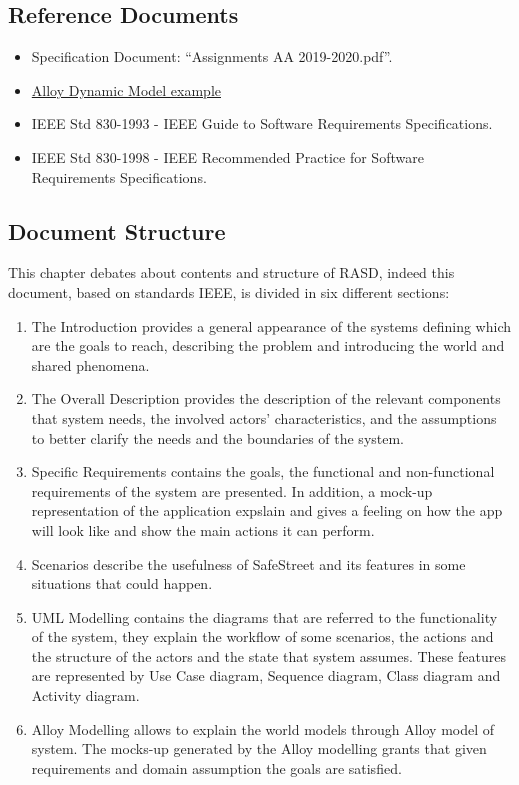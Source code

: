 \subsection {Reference Documents}
\begin{itemize}
\item	Specification Document: “Assignments AA 2019-2020.pdf”.
\item	\href{http://homepage.cs.uiowa.edu/~tinelli/classes/181/Spring10/Notes/09-dynamic-models.pdf }{Alloy Dynamic Model example} 
\item	IEEE Std 830-1993 - IEEE Guide to Software Requirements Specifications.
\item	IEEE Std 830-1998 - IEEE Recommended Practice for Software Requirements Specifications.

\end{itemize}
\subsection{Document Structure}
This chapter debates about contents and structure of RASD, indeed this document, based on standards IEEE, is divided in six different sections:
\begin{enumerate}
\item	The Introduction provides a general appearance of the systems defining which are the goals to reach, describing the problem and introducing the world and shared phenomena.
\item The Overall Description provides the description of the relevant components that system needs, the involved actors’ characteristics, and the assumptions to better clarify the needs and the boundaries of the system. 
\item Specific Requirements contains the goals, the functional and non-functional requirements of the system are presented. In addition, a mock-up representation of the application expslain and gives a feeling on how the app will look like and show the main actions it can perform.
\item Scenarios describe the usefulness of SafeStreet and its features in some situations that could happen.
\item UML Modelling contains the diagrams that are referred to the functionality of the system, they explain the workflow of some scenarios, the actions and the structure of the actors and the state that system assumes. These features are represented by Use Case diagram, Sequence diagram, Class diagram and Activity diagram.
\item Alloy Modelling allows to explain the world models through Alloy model of system. The mocks-up generated by the Alloy modelling grants that given requirements and domain assumption the goals are satisfied.

\end{enumerate}
